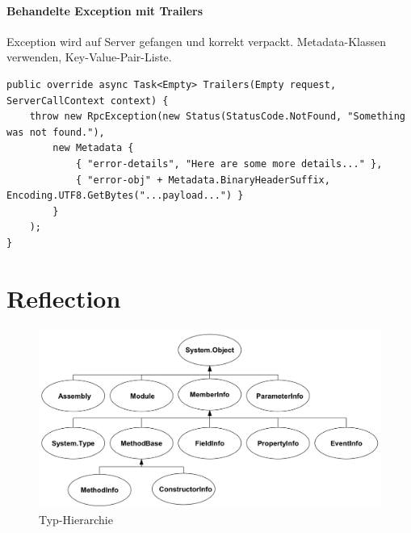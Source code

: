 \documentclass[
a4paper,
oneside,
10pt,
fleqn,
headsepline,
toc=listofnumbered, 
bibliography=totocnumbered]{scrartcl}
\let\stdsection\section
\renewcommand\section{\clearpage\stdsection}
\begin{document}
\paragraph{Behandelte Exception mit Trailers} Exception wird auf Server gefangen und korrekt verpackt. Metadata-Klassen verwenden, Key-Value-Pair-Liste.
\begin{lstlisting}
public override async Task<Empty> Trailers(Empty request, ServerCallContext context) {
    throw new RpcException(new Status(StatusCode.NotFound, "Something was not found."),
        new Metadata {
            { "error-details", "Here are some more details..." },
            { "error-obj" + Metadata.BinaryHeaderSuffix, Encoding.UTF8.GetBytes("...payload...") }
        }
    );
}
\end{lstlisting}

\section{Reflection}

\begin{figure}[h!]
\centering
\includegraphics[width=0.8\linewidth]{images/member_hierarchie}
\caption{Typ-Hierarchie}
\label{fig:valuetypes}
\end{figure}
\end{document}
